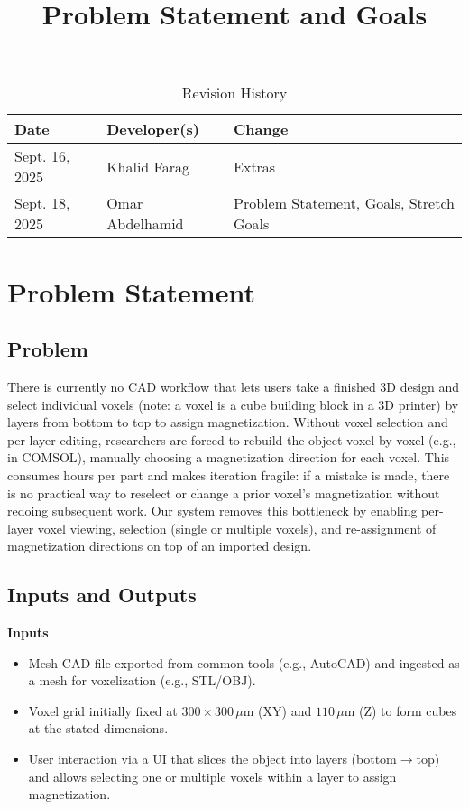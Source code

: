 \documentclass{article}
\title{Problem Statement and Goals\\\progname}
\author{\authname}
\date{}
\begin{document}
\maketitle

\begin{table}[hp]
\caption{Revision History} \label{TblRevisionHistory}
\begin{tabularx}{\textwidth}{llX}
\toprule
\textbf{Date} & \textbf{Developer(s)} & \textbf{Change}\\
\midrule
Sept. 16, 2025 & Khalid Farag & Extras\\
Sept. 18, 2025 & Omar Abdelhamid & Problem Statement, Goals, Stretch Goals\\
\bottomrule
\end{tabularx}
\end{table}

\section{Problem Statement}


\subsection{Problem}
There is currently no CAD workflow that lets users take a finished 3D design and
select individual voxels (note: a voxel is a cube building block in a 3D printer) by layers from bottom to top to assign
magnetization. Without voxel selection and per-layer editing, researchers are
forced to rebuild the object voxel-by-voxel (e.g., in COMSOL), manually choosing
a magnetization direction for each voxel. This consumes hours per part and
makes iteration fragile: if a mistake is made, there is no practical way to
reselect or change a prior voxel’s magnetization without redoing subsequent work.
Our system removes this bottleneck by enabling per-layer voxel viewing,
selection (single or multiple voxels), and re-assignment of magnetization
directions on top of an imported design.


\subsection{Inputs and Outputs}
\textbf{Inputs}
\begin{itemize}
  \item Mesh CAD file exported from common tools (e.g., AutoCAD) and ingested as a mesh for voxelization (e.g., STL/OBJ).
  \item Voxel grid initially fixed at $300 \times 300\,\mu\text{m}$ (XY) and $110\,\mu\text{m}$ (Z) to form cubes at the stated dimensions.
  \item User interaction via a UI that slices the object into layers (bottom$\rightarrow$top) and allows selecting one or multiple voxels within a layer to assign magnetization.
\end{itemize}
\end{document}
